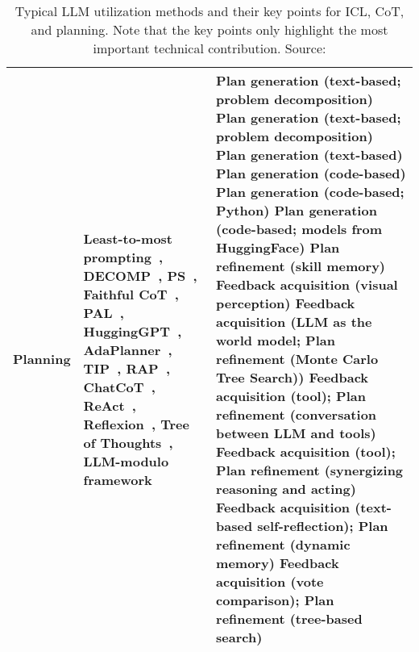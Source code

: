 \begin{table}[h!]
\begin{tabularx}{\textwidth}{|l|X|X|}
		\textbf{Planning}                         & Least-to-most prompting~\cite{zhou2022least}, DECOMP~\cite{khot2022decomposed}, PS~\cite{wang2023plan}, Faithful CoT~\cite{lyu2023faithful}, PAL~\cite{gao2022pal}, HuggingGPT~\cite{shen2023hugginggpt}, AdaPlanner~\cite{sun2023adaplanner}, TIP~\cite{lu2023multimodal}, RAP~\cite{hao2023reasoning}, ChatCoT~\cite{chen2023chatcot}, ReAct~\cite{yao2022react}, Reflexion~\cite{shinn2023reflexion}, Tree of Thoughts~\cite{yao2023tree}, LLM-modulo framework~\cite{kambhampati2024llmscantplanhelp} & Plan generation (text-based; problem decomposition) \newline Plan generation (text-based; problem decomposition) \newline Plan generation (text-based) \newline Plan generation (code-based) \newline Plan generation (code-based; Python) \newline Plan generation (code-based; models from HuggingFace) \newline Plan refinement (skill memory) \newline Feedback acquisition (visual perception) \newline Feedback acquisition (LLM as the world model; Plan refinement (Monte Carlo Tree Search)) \newline Feedback acquisition (tool); Plan refinement (conversation between LLM and tools) \newline Feedback acquisition (tool); Plan refinement (synergizing reasoning and acting) \newline Feedback acquisition (text-based self-reflection); Plan refinement (dynamic memory) \newline Feedback acquisition (vote comparison); Plan refinement (tree-based search) \\
		\hline
	\end{tabularx}
	\caption{Typical LLM utilization methods and their key points for ICL, CoT, and planning. Note that the key points only highlight the most important technical contribution. Source: \textcite{survey}}
	\label{tab:utilization-methods}
\end{table}

